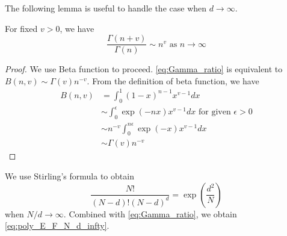 \documentclass{aptpub}
\begin{document}
The following lemma is useful to handle the case when $d\to \infty$.
\begin{lemma}
     For fixed $v>0$, we have
     \begin{equation}\label{eq:Gamma_ratio}
         \frac{\Gamma(n+v)}{\Gamma(n)} \sim
         n^v
         \textrm{ as } n \to \infty             
     \end{equation}
 \end{lemma}
 \begin{proof}
     We use Beta function to proceed.
     \eqref{eq:Gamma_ratio} is equivalent to
     $B(n, v) \sim \Gamma(v) n^{-v}$.
     From the definition of beta function,
     we have
     \begin{align*}
         B(n,v) &=\int_0^1 (1-x)^{n-1} x^{v-1} dx \\
         &\sim \int_0^{\epsilon} \exp(-nx) x^{v-1}dx \textrm{ for given } \epsilon>0\\
         & \sim n^{-v} \int_0^{n\epsilon} \exp(-x)x^{v-1}dx\\
         &\sim \Gamma(v) n^{-v}
     \end{align*}
 \end{proof}
We use Stirling's formula to 
obtain
\begin{equation}
     \frac{N!}{(N-d)! (N-d)^d}
     = \exp
     \left(\frac{d^2}{N} \right)  
\end{equation}
when $N/d\to \infty$.
Combined with \eqref{eq:Gamma_ratio}, we obtain \eqref{eq:poly_E_F_N_d_infty}.
\end{document}
